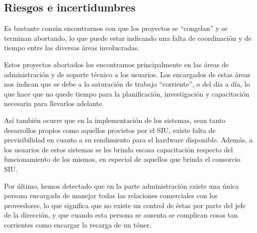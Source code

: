 \documentclass[a4paper,11pt,oneside]{article}
\begin{document}
\subsection*{Riesgos e incertidumbres}
%
Es bastante común encontrarnos con que los proyectos se ``congelan'' y
se terminan abortando, lo que puede estar indicando una falta de
coordinación y de tiempo entre las diversas áreas involucradas.

Estos proyectos abortados los encontramos principalmente en las áreas
de administración y de soporte técnico a los usuarios. Los encargados
de estas áreas nos indican que se debe a la saturación de trabajo
``corriente'', o del día a día, lo que hace que no quede tiempo para
la planificación, investigación y capacitación necesaria para
llevarlos adelante.



Así también ocurre que en la implementación de los sistemas, sean
tanto desarrollos propios como aquellos provistos por el SIU, existe
falta de previsibilidad en cuanto a su rendimiento para el hardware
disponible. Además, a los usuarios de estos sistemas se les brinda
escasa capacitación respecto del funcionamiento de los mismos, en
especial de aquellos que brinda el consorcio SIU.


Por último, hemos detectado que en la parte administración existe una
única persona encargada de manejar todas las relaciones comerciales
con los proveedores, lo que significa que no existe un control de
éstas por parte del jefe de la dirección, y que cuando esta persona se
ausenta se complican cosas tan corrientes como encargar la recarga de
un tóner.
\end{document}
